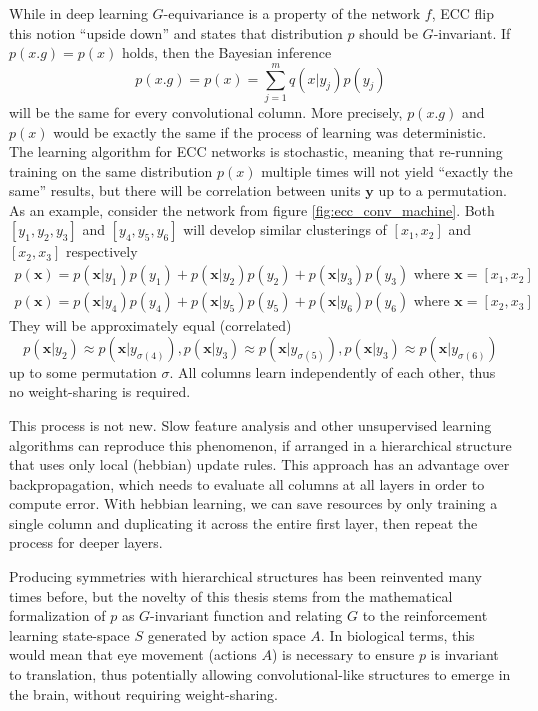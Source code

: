 \documentclass[12pt]{article}
\begin{document}
While in deep learning $G$-equivariance is a property of the network $f$, ECC flip this notion ``upside down'' and states that distribution $p$ should be $G$-invariant. If $p(x.g)=p(x)$ holds, then the Bayesian inference
\[
p(x.g) = p(x) = \sum_{j=1}^m q(x|y_j)p(y_j)  
\]
will be the same for every convolutional column. More precisely, $p(x.g)$ and $p(x)$ would be exactly the same if the process of learning was deterministic. The learning algorithm for ECC networks is stochastic, meaning that re-running training on the same distribution $p(x)$ multiple times will not yield ``exactly the same'' results, but there will be correlation between units $\boldsymbol{y}$ up to a permutation.
As an example, consider the network from figure \ref{fig:ecc_conv_machine}. Both $[y_1,y_2,y_3]$ and $[y_4,y_5,y_6]$ will develop similar clusterings of $[x_1,x_2]$ and $[x_2,x_3]$ respectively
\begin{gather*}
	p(\boldsymbol{x}) = p(\boldsymbol{x}|y_1)p(y_1)+  p(\boldsymbol{x}|y_2)p(y_2)+  p(\boldsymbol{x}|y_3)p(y_3)\text{ where }\boldsymbol{x}=[x_1,x_2] \\
	p(\boldsymbol{x}) = p(\boldsymbol{x}|y_4)p(y_4)+  p(\boldsymbol{x}|y_5)p(y_5)+  p(\boldsymbol{x}|y_6)p(y_6)\text{ where }\boldsymbol{x}=[x_2,x_3]
\end{gather*}
They will be approximately equal  (correlated)
\[p(\boldsymbol{x}|y_2) \approx p(\boldsymbol{x}|y_{\sigma(4)}), p(\boldsymbol{x}|y_{3}) \approx p(\boldsymbol{x}|y_{\sigma(5)}),p(\boldsymbol{x}|y_3) \approx p(\boldsymbol{x}|y_{\sigma(6)})\]
up to some permutation $\sigma$. All columns learn independently of each other, thus no weight-sharing is required.

This process is not new. Slow feature analysis and other unsupervised learning algorithms can reproduce this phenomenon, if arranged in a hierarchical structure that uses only local (hebbian) update rules. This approach has an advantage over backpropagation, which needs to evaluate all columns at all layers in order to compute error. With hebbian learning, we can save resources by only training a single column and  duplicating it across the entire first layer, then repeat the process for deeper layers.

Producing symmetries with hierarchical structures has been reinvented many times before, but the novelty of this thesis stems from the mathematical formalization of $p$ as $G$-invariant function and relating $G$ to the reinforcement learning state-space $S$ generated by action space $A$. In biological terms, this would mean that eye movement (actions $A$) is necessary to ensure $p$ is invariant to translation, thus potentially allowing convolutional-like structures to emerge in the brain, without requiring weight-sharing.
\end{document}

